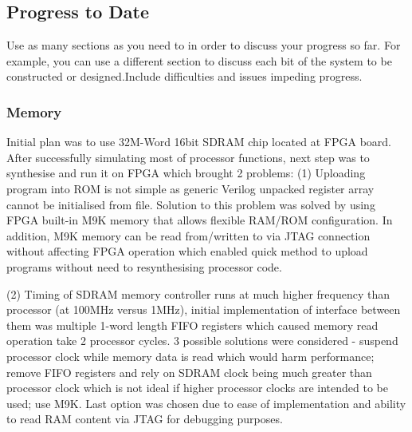 \documentclass[a4paper,12pt]{article}
\begin{document}
\begin{multicols}{2}

\subsection{Progress to Date}
Use as many sections as you need to in order to discuss your progress so far. For example, you can use a different section to discuss each bit of the system to be constructed or designed.Include difficulties and issues impeding progress.


\subsubsection{Memory}
Initial plan was to use 32M-Word 16bit SDRAM chip located at FPGA board. After successfully simulating most of processor functions, next step was to synthesise and run it on FPGA which brought 2 problems: (1) Uploading program into ROM is not simple as generic Verilog unpacked register array cannot be initialised from file. Solution to this problem was solved by using FPGA built-in M9K memory that allows flexible RAM/ROM configuration. In addition, M9K memory can be read from/written to via JTAG connection without affecting FPGA operation which enabled quick method to upload programs without need to resynthesising processor code.

(2) Timing of SDRAM memory controller runs at much higher frequency than processor (at 100MHz versus 1MHz), initial implementation of interface between them was multiple 1-word length FIFO registers which caused memory read operation take 2 processor cycles. 3 possible solutions were considered - suspend processor clock while memory data is read which would harm performance; remove FIFO registers and rely on SDRAM clock being much greater than processor clock which is not ideal if higher processor clocks are intended to be used; use M9K. Last option was chosen due to ease of implementation and ability to read RAM content via JTAG for debugging purposes.

\end{multicols}
\newpage
\end{document}
